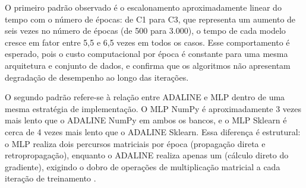 \begin{table}[H]
\centering
\caption{Tempo de ajuste de pesos (segundos), Banco 2 (167 amostras de treino).}
\label{tab:tempo_banco2}
\end{table}

O primeiro padr\~ao observado \'e o escalonamento aproximadamente linear do tempo
com o n\'umero de \'epocas: de C1 para C3, que representa um aumento de seis vezes no
n\'umero de \'epocas (de 500 para 3.000), o tempo de cada modelo cresce em fator entre 5,5 e
6,5 vezes em todos os casos. Esse comportamento \'e esperado, pois o custo computacional
por \'epoca \'e constante para uma mesma arquitetura e conjunto de dados, e confirma que os
algoritmos n\~ao apresentam degrada\c c\~ao de desempenho ao longo das itera\c c\~oes.

O segundo padr\~ao refere-se \`a rela\c c\~ao entre ADALINE e MLP dentro de uma mesma
estrat\'egia de implementa\c c\~ao. O MLP NumPy \'e aproximadamente 3 vezes mais lento que
o ADALINE NumPy em ambos os bancos, e o MLP Sklearn \'e cerca de 4 vezes mais
lento que o ADALINE Sklearn. Essa diferen\c ca \'e estrutural: o MLP realiza dois percursos
matriciais por \'epoca (propaga\c c\~ao direta e retropropaga\c c\~ao), enquanto o ADALINE realiza
apenas um (c\'alculo direto do gradiente), exigindo o dobro de opera\c c\~oes de multiplica\c c\~ao
matricial a cada itera\c c\~ao de treinamento \cite{braga2007}.

